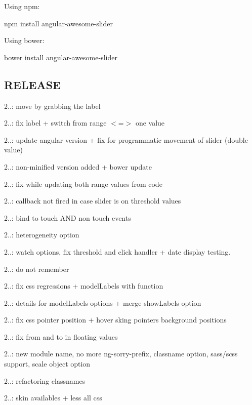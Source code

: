 Using npm\+:


\begin{DoxyCode}
npm install angular-awesome-slider
\end{DoxyCode}


Using bower\+:


\begin{DoxyCode}
bower install angular-awesome-slider
\end{DoxyCode}


\subsection*{R\+E\+L\+E\+A\+SE }


\begin{DoxyItemize}
\item 2..\+: move by grabbing the label
\item 2..\+: fix label + switch from range $<$=$>$ one value
\item 2..\+: update angular version + fix for programmatic movement of slider (double value)
\item 2..\+: non-\/minified version added + bower update
\item 2..\+: fix while updating both range values from code
\item 2..\+: callback not fired in case slider is on threshold values
\item 2..\+: bind to touch A\+ND non touch events
\item 2..\+: heterogeneity option
\item 2..\+: watch options, fix threshold and click handler + date display testing.
\item 2..\+: do not remember
\item 2..\+: fix css regressions + model\+Labels with function
\item 2..\+: details for model\+Labels options + merge show\+Labels option
\item 2..\+: fix css pointer position + hover sking pointers background positions
\item 2..\+: fix from and to in floating values
\item 2..\+: new module name, no more ng-\/sorry-\/prefix, classname option, sass/scss support, scale object option
\item 2..\+: refactoring classnames
\item 2..\+: skin availables + less all css

\end{DoxyItemize}
